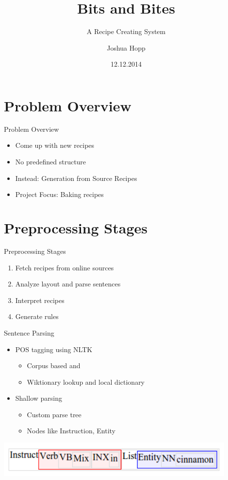 \documentclass{beamer}
\title{Bits and Bites}
\subtitle{A Recipe Creating System}
\author{Joshua Hopp}
\date{12.12.2014}
\begin{document}
\begin{frame}[plain]
	\titlepage
\end{frame}

\section{Problem Overview}
\begin{frame}{Problem Overview}
 \begin{itemize}
  \item Come up with new recipes
  \item No predefined structure
  \item Instead: Generation from Source Recipes
  \item Project Focus: Baking recipes
 \end{itemize}
\end{frame}

\section{Preprocessing Stages}
\begin{frame}{Preprocessing Stages}
 \begin{enumerate}
  \item Fetch recipes from online sources
  \item Analyze layout and parse sentences
  \item Interpret recipes 
  \item Generate rules
 \end{enumerate}
\end{frame}

\begin{frame}{Sentence Parsing}
 \begin{itemize}
  \item POS tagging using NLTK
    \begin{itemize}
     \item Corpus based and
     \item Wiktionary lookup and local dictionary
    \end{itemize}
  \item Shallow parsing
    \begin{itemize}
     \item Custom parse tree
     \item Nodes like Instruction, Entity
    \end{itemize}
 \end{itemize}
 
 \includegraphics[width=0.9\textwidth]{images/parsing}

\end{frame}
\end{document}
